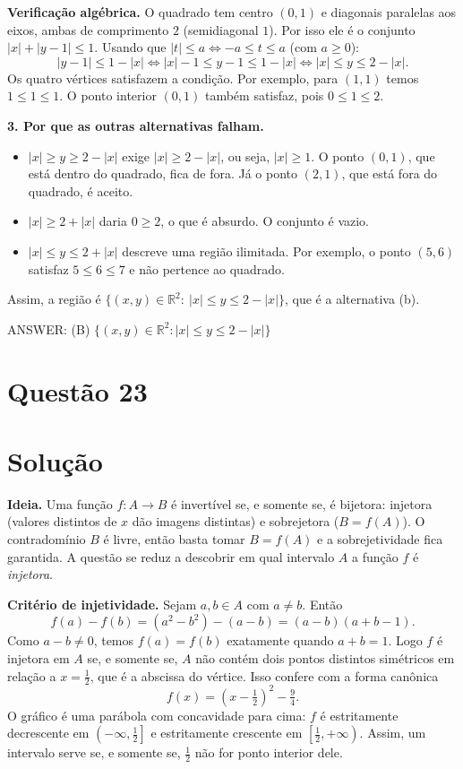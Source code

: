 \documentclass{article}%
\begin{document}
\textbf{Verificação algébrica.} O quadrado tem centro $(0,1)$ e diagonais paralelas aos eixos, ambas de comprimento $2$ (semidiagonal $1$). Por isso ele é o conjunto $|x|+|y-1|\le 1$. Usando que $|t|\le a \iff -a\le t\le a$ (com $a\ge 0$):
\[
|y-1|\le 1-|x| \iff |x|-1\le y-1\le 1-|x| \iff |x|\le y\le 2-|x| .
\]
Os quatro vértices satisfazem a condição. Por exemplo, para $(1,1)$ temos $1\le 1\le 1$. O ponto interior $(0,1)$ também satisfaz, pois $0\le 1\le 2$.

\textbf{3. Por que as outras alternativas falham.}
\begin{itemize}
\item[(a)] $|x|\ge y\ge 2-|x|$ exige $|x|\ge 2-|x|$, ou seja, $|x|\ge 1$. O ponto $(0,1)$, que está dentro do quadrado, fica de fora. Já o ponto $(2,1)$, que está fora do quadrado, é aceito.
\item[(c)] $|x|\ge 2+|x|$ daria $0\ge 2$, o que é absurdo. O conjunto é vazio.
\item[(d)] $|x|\le y\le 2+|x|$ descreve uma região ilimitada. Por exemplo, o ponto $(5,6)$ satisfaz $5\le 6\le 7$ e não pertence ao quadrado.
\end{itemize}

Assim, a região é $\{(x,y)\in\mathbb{R}^2:\ |x|\le y\le 2-|x|\}$, que é a alternativa (b).

ANSWER: (B) $\{(x,y)\in\mathbb{R}^2: |x|\le y\le 2-|x|\}$%
\newpage%
\section*{Questão 23}

\section*{Solução}

\textbf{Ideia.} Uma função $f:A\to B$ é invertível se, e somente se, é bijetora: injetora (valores distintos de $x$ dão imagens distintas) e sobrejetora ($B=f(A)$). O contradomínio $B$ é livre, então basta tomar $B=f(A)$ e a sobrejetividade fica garantida. A questão se reduz a descobrir em qual intervalo $A$ a função $f$ é \emph{injetora}.

\textbf{Critério de injetividade.} Sejam $a,b\in A$ com $a\neq b$. Então
\[
f(a)-f(b)=(a^2-b^2)-(a-b)=(a-b)(a+b-1).
\]
Como $a-b\neq 0$, temos $f(a)=f(b)$ exatamente quando $a+b=1$. Logo $f$ é injetora em $A$ se, e somente se, $A$ não contém dois pontos distintos simétricos em relação a $x=\tfrac12$, que é a abscissa do vértice. Isso confere com a forma canônica
\[
f(x)=\left(x-\tfrac12\right)^2-\tfrac94 .
\]
O gráfico é uma parábola com concavidade para cima: $f$ é estritamente decrescente em $\left(-\infty,\tfrac12\right]$ e estritamente crescente em $\left[\tfrac12,+\infty\right)$. Assim, um intervalo serve se, e somente se, $\tfrac12$ não for ponto interior dele.
\end{document}
